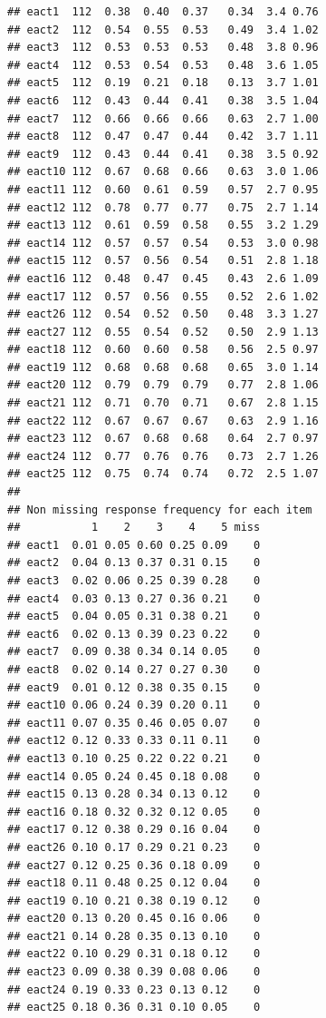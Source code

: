 \documentclass[
]{article}
\begin{document}
\begin{verbatim}
## eact1  112  0.38  0.40  0.37   0.34  3.4 0.76
## eact2  112  0.54  0.55  0.53   0.49  3.4 1.02
## eact3  112  0.53  0.53  0.53   0.48  3.8 0.96
## eact4  112  0.53  0.54  0.53   0.48  3.6 1.05
## eact5  112  0.19  0.21  0.18   0.13  3.7 1.01
## eact6  112  0.43  0.44  0.41   0.38  3.5 1.04
## eact7  112  0.66  0.66  0.66   0.63  2.7 1.00
## eact8  112  0.47  0.47  0.44   0.42  3.7 1.11
## eact9  112  0.43  0.44  0.41   0.38  3.5 0.92
## eact10 112  0.67  0.68  0.66   0.63  3.0 1.06
## eact11 112  0.60  0.61  0.59   0.57  2.7 0.95
## eact12 112  0.78  0.77  0.77   0.75  2.7 1.14
## eact13 112  0.61  0.59  0.58   0.55  3.2 1.29
## eact14 112  0.57  0.57  0.54   0.53  3.0 0.98
## eact15 112  0.57  0.56  0.54   0.51  2.8 1.18
## eact16 112  0.48  0.47  0.45   0.43  2.6 1.09
## eact17 112  0.57  0.56  0.55   0.52  2.6 1.02
## eact26 112  0.54  0.52  0.50   0.48  3.3 1.27
## eact27 112  0.55  0.54  0.52   0.50  2.9 1.13
## eact18 112  0.60  0.60  0.58   0.56  2.5 0.97
## eact19 112  0.68  0.68  0.68   0.65  3.0 1.14
## eact20 112  0.79  0.79  0.79   0.77  2.8 1.06
## eact21 112  0.71  0.70  0.71   0.67  2.8 1.15
## eact22 112  0.67  0.67  0.67   0.63  2.9 1.16
## eact23 112  0.67  0.68  0.68   0.64  2.7 0.97
## eact24 112  0.77  0.76  0.76   0.73  2.7 1.26
## eact25 112  0.75  0.74  0.74   0.72  2.5 1.07
## 
## Non missing response frequency for each item
##           1    2    3    4    5 miss
## eact1  0.01 0.05 0.60 0.25 0.09    0
## eact2  0.04 0.13 0.37 0.31 0.15    0
## eact3  0.02 0.06 0.25 0.39 0.28    0
## eact4  0.03 0.13 0.27 0.36 0.21    0
## eact5  0.04 0.05 0.31 0.38 0.21    0
## eact6  0.02 0.13 0.39 0.23 0.22    0
## eact7  0.09 0.38 0.34 0.14 0.05    0
## eact8  0.02 0.14 0.27 0.27 0.30    0
## eact9  0.01 0.12 0.38 0.35 0.15    0
## eact10 0.06 0.24 0.39 0.20 0.11    0
## eact11 0.07 0.35 0.46 0.05 0.07    0
## eact12 0.12 0.33 0.33 0.11 0.11    0
## eact13 0.10 0.25 0.22 0.22 0.21    0
## eact14 0.05 0.24 0.45 0.18 0.08    0
## eact15 0.13 0.28 0.34 0.13 0.12    0
## eact16 0.18 0.32 0.32 0.12 0.05    0
## eact17 0.12 0.38 0.29 0.16 0.04    0
## eact26 0.10 0.17 0.29 0.21 0.23    0
## eact27 0.12 0.25 0.36 0.18 0.09    0
## eact18 0.11 0.48 0.25 0.12 0.04    0
## eact19 0.10 0.21 0.38 0.19 0.12    0
## eact20 0.13 0.20 0.45 0.16 0.06    0
## eact21 0.14 0.28 0.35 0.13 0.10    0
## eact22 0.10 0.29 0.31 0.18 0.12    0
## eact23 0.09 0.38 0.39 0.08 0.06    0
## eact24 0.19 0.33 0.23 0.13 0.12    0
## eact25 0.18 0.36 0.31 0.10 0.05    0
\end{verbatim}
\end{document}

